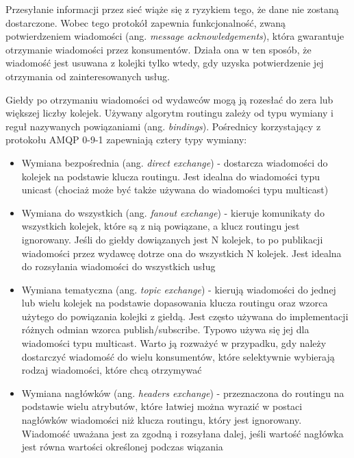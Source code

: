 Przesyłanie informacji przez sieć wiąże się z ryzykiem tego, że dane nie zostaną 
dostarczone. Wobec tego protokół zapewnia funkcjonalność, zwaną potwierdzeniem 
wiadomości (ang. \textit{message acknowledgements}), która gwarantuje otrzymanie wiadomości 
przez konsumentów. Działa ona w ten sposób, że wiadomość jest usuwana z kolejki tylko 
wtedy, gdy uzyska potwierdzenie jej otrzymania od zainteresowanych usług.

Giełdy po otrzymaniu wiadomości od wydawców mogą ją rozesłać do zera lub większej 
liczby kolejek. Używany algorytm routingu zależy od typu wymiany i reguł nazywanych 
powiązaniami (ang. \textit{bindings}). Pośrednicy korzystający z protokołu AMQP 0-9-1 zapewniają 
cztery typy wymiany:

\begin{itemize} %
    \item Wymiana bezpośrednia (ang. \textit{direct exchange}) - dostarcza wiadomości do kolejek 
    na podstawie klucza routingu. Jest idealna do wiadomości typu unicast 
    (chociaż może być także używana do wiadomości typu multicast)
    \item Wymiana do wszystkich (ang. \textit{fanout exchange}) - kieruje komunikaty do wszystkich 
    kolejek, które są z nią powiązane, a klucz routingu jest ignorowany. Jeśli do 
    giełdy dowiązanych jest N kolejek, to po publikacji wiadomości przez wydawcę 
    dotrze ona do wszystkich N kolejek. Jest idealna do rozsyłania wiadomości do 
    wszystkich usług
    \item Wymiana tematyczna (ang. \textit{topic exchange}) - kierują wiadomości do jednej lub 
    wielu kolejek na podstawie dopasowania klucza routingu oraz wzorca użytego do 
    powiązania kolejki z giełdą. Jest często używana do implementacji różnych odmian 
    wzorca publish/subscribe. Typowo używa się jej dla wiadomości typu multicast. 
    Warto ją rozważyć w przypadku, gdy należy dostarczyć wiadomość do wielu 
    konsumentów, które selektywnie wybierają rodzaj wiadomości, które chcą otrzymywać
    \item Wymiana nagłówków (ang. \textit{headers exchange}) - przeznaczona do routingu na 
    podstawie wielu atrybutów, które łatwiej można wyrazić w postaci nagłówków 
    wiadomości niż klucza routingu, który jest ignorowany. Wiadomość uważana jest za 
    zgodną i rozsyłana dalej, jeśli wartość nagłówka jest równa wartości określonej 
    podczas wiązania
\end{itemize}

